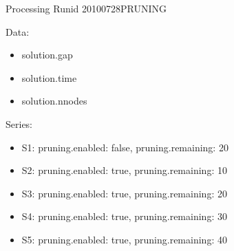 \documentclass[landscape, 12pt]{report}
\begin{document}
	
	Processing Runid 20100728PRUNING
 
Data:
\begin{itemize}
\item solution.gap
\item solution.time
\item solution.nnodes
\end{itemize}
Series:
\begin{itemize}
\item S1: pruning.enabled: false, pruning.remaining: 20
\item S2: pruning.enabled: true, pruning.remaining: 10
\item S3: pruning.enabled: true, pruning.remaining: 20
\item S4: pruning.enabled: true, pruning.remaining: 30
\item S5: pruning.enabled: true, pruning.remaining: 40
\end{itemize}
\end{document}
